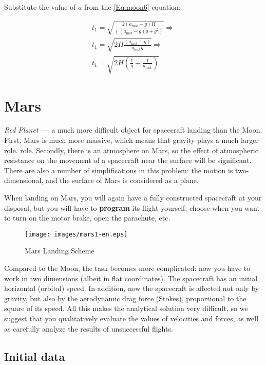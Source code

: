 \documentclass[12pt,a4paper]{article}
\begin{document}
Substitute the value of $a$ from the \ref{Eq:moon6} equation:

$$
\begin{array}{c}
  t_1 = \sqrt{\frac{2 \left(a_{\text{mot}} - g\right) H}{\left((a_{\text{mot}} - g) g + g^2\right)}} \Rightarrow \\
  t_1 = \sqrt{2 H \frac{\left(a_{\text{mot}} - g\right)}{a_{\text{mot}} g}} \Rightarrow \\
    t_1 = \sqrt{2 H \left(\frac{1}{g} - \frac{1}{a_{\text{mot}}}\right)}
\end{array}
$$

\section{Mars}

\emph{Red Planet}~--- a much more difficult object for spacecraft landing than the Moon. First, Mars is much more massive, which means that gravity plays a much larger role.
role. Secondly, there is an atmosphere on Mars, so the effect of atmospheric resistance on the movement of a spacecraft near the surface will be significant. There are also a number of simplifications in this problem: the motion is two-dimensional, and the surface of Mars is considered as a plane.

When landing on Mars, you will again have a fully constructed spacecraft at your disposal, but you will have to \textbf{program} its flight yourself: choose when you want to turn on the motor brake, open the parachute, etc.

\begin{figure}[tbh]
  \begin{center}
    \texttt{[image: images/mars1-en.eps]}
    \caption{Mars Landing Scheme}
    \label{Pic:mars}
  \end{center}
\end{figure}

Compared to the Moon, the task becomes more complicated: now you have to work in two dimensions (albeit in flat coordinates). The spacecraft has an initial horizontal (orbital) speed. In addition, now the spacecraft is affected not only by gravity, but also by the aerodynamic drag force (Stokes), proportional to the square of its speed. All this makes the analytical solution very difficult, so we suggest that you qualitatively evaluate the values of velocities and forces, as well as carefully analyze the results of unsuccessful flights.

\subsection{Initial data}
\end{document}
